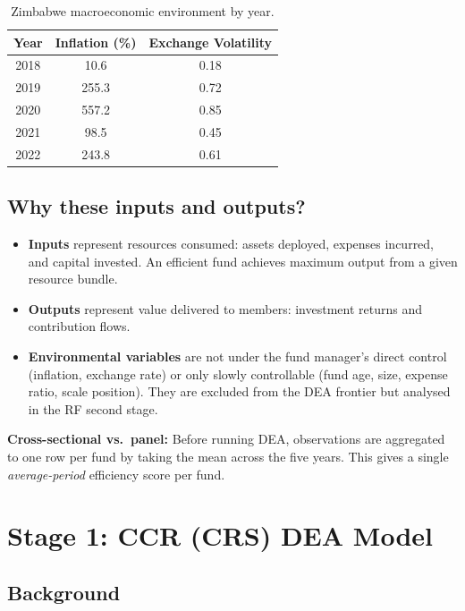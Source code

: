 \documentclass[12pt,a4paper]{article}
\begin{document}
\begin{table}[H]
\centering
\begin{tabular}{ccc}
\toprule
\textbf{Year} & \textbf{Inflation (\%)} & \textbf{Exchange Volatility} \\
\midrule
2018 & 10.6  & 0.18 \\
2019 & 255.3 & 0.72 \\
2020 & 557.2 & 0.85 \\
2021 & 98.5  & 0.45 \\
2022 & 243.8 & 0.61 \\
\bottomrule
\end{tabular}
\caption{Zimbabwe macroeconomic environment by year.}
\end{table}

\subsection*{Why these inputs and outputs?}

\begin{itemize}
    \item \textbf{Inputs} represent resources consumed: assets deployed, expenses
          incurred, and capital invested.  An efficient fund achieves maximum
          output from a given resource bundle.
    \item \textbf{Outputs} represent value delivered to members: investment returns
          and contribution flows.
    \item \textbf{Environmental variables} are not under the fund manager's direct
          control (inflation, exchange rate) or only slowly controllable (fund age,
          size, expense ratio, scale position).
          They are excluded from the DEA frontier but analysed in the RF second stage.
\end{itemize}

\textbf{Cross-sectional vs.\ panel:}  Before running DEA, observations are
aggregated to one row per fund by taking the mean across the five years.
This gives a single \emph{average-period} efficiency score per fund.

\section{Stage 1: CCR (CRS) DEA Model}

\subsection{Background}
\end{document}
